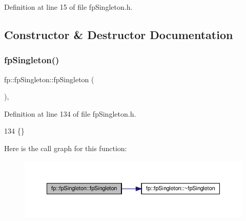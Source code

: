 Definition at line 15 of file fp\+Singleton.\+h.



\subsection{Constructor \& Destructor Documentation}
\mbox{\label{classfp_1_1fpSingleton_a049e41d4468d9b9f1e08788592c5f4cd}} 
\subsubsection{\texorpdfstring{fp\+Singleton()}{fpSingleton()}\hspace{0.1cm}{\footnotesize\ttfamily [1/2]}}
{\footnotesize\ttfamily fp\+::fp\+Singleton\+::fp\+Singleton (\begin{DoxyParamCaption}{ }\end{DoxyParamCaption})\hspace{0.3cm}{\ttfamily [inline]}, {\ttfamily [private]}}



Definition at line 134 of file fp\+Singleton.\+h.


\begin{DoxyCode}
134 \{\}
\end{DoxyCode}
Here is the call graph for this function\+:\nopagebreak
\begin{figure}[H]
\begin{center}
\leavevmode
\includegraphics[width=350pt]{classfp_1_1fpSingleton_a049e41d4468d9b9f1e08788592c5f4cd_cgraph}
\end{center}
\end{figure}
\mbox{\label{classfp_1_1fpSingleton_a5ea4d9f5a5811e9d9a64581dea9f561a}} 
